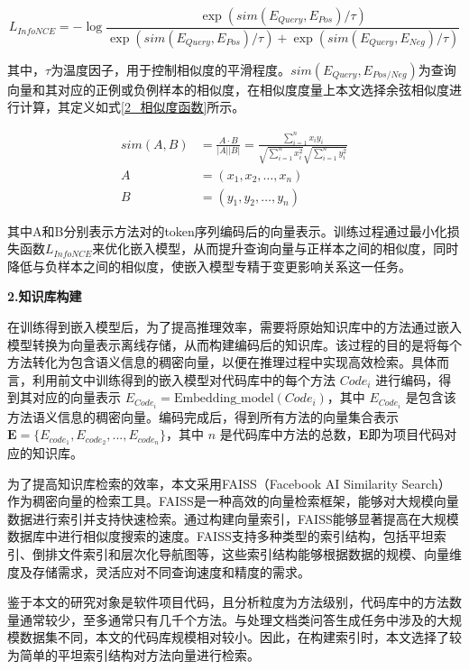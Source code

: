 \begin{equation}
    L_{InfoNCE} = -\log\frac{\exp(sim(E_{Query}, E_{Pos}) / \tau)}
    {\exp(sim(E_{Query}, E_{Pos}) / \tau)+\exp(sim(E_{Query}, E_{Neg}) / \tau)}
\label{2_损失函数}
\end{equation}


其中，$\tau$为温度因子，用于控制相似度的平滑程度。$sim(E_{Query}, E_{Pos/Neg})$为查询向量和其对应的正例或负例样本的相似度，在相似度度量上本文选择余弦相似度进行计算，其定义如式\ref{2_相似度函数}所示。

\begin{align}
\label{2_相似度函数}
sim(A,B)&=\frac{A\cdot B}{\vert A\vert\vert B\vert}=\frac{\sum_{i = 1}^{n}x_iy_i}{\sqrt{\sum_{i = 1}^{n}x_i^2}\sqrt{\sum_{i = 1}^{n}y_i^2}} \\
A &= (x_1, x_2, \dots, x_n) \\
B &= (y_1, y_2, \dots, y_n)
\end{align}

其中A和B分别表示方法对的token序列编码后的向量表示。训练过程通过最小化损失函数$L_{InfoNCE}$来优化嵌入模型，从而提升查询向量与正样本之间的相似度，同时降低与负样本之间的相似度，使嵌入模型专精于变更影响关系这一任务。

\noindent \textbf{2.知识库构建}

在训练得到嵌入模型后，为了提高推理效率，需要将原始知识库中的方法通过嵌入模型转换为向量表示离线存储，从而构建编码后的知识库。该过程的目的是将每个方法转化为包含语义信息的稠密向量，以便在推理过程中实现高效检索。具体而言，利用前文中训练得到的嵌入模型对代码库中的每个方法 $Code_i$ 进行编码，得到其对应的向量表示 $E_{Code_i} = \text{Embedding\_model}(Code_i)$，其中 $E_{Code_i}$ 是包含该方法语义信息的稠密向量。编码完成后，得到所有方法的向量集合表示 $\mathbf{E} = \{ E_{code_1}, E_{code_2}, ..., E_{code_n} \}$，其中 $n$ 是代码库中方法的总数，$\mathbf{E}$即为项目代码对应的知识库。


为了提高知识库检索的效率，本文采用FAISS（Facebook AI Similarity Search）作为稠密向量的检索工具。FAISS是一种高效的向量检索框架，能够对大规模向量数据进行索引并支持快速检索\cite{meta2024faiss}。通过构建向量索引，FAISS能够显著提高在大规模数据库中进行相似度搜索的速度。FAISS支持多种类型的索引结构，包括平坦索引、倒排文件索引和层次化导航图等，这些索引结构能够根据数据的规模、向量维度及存储需求，灵活应对不同查询速度和精度的需求。

鉴于本文的研究对象是软件项目代码，且分析粒度为方法级别，代码库中的方法数量通常较少，至多通常只有几千个方法。与处理文档类问答生成任务中涉及的大规模数据集不同，本文的代码库规模相对较小。因此，在构建索引时，本文选择了较为简单的平坦索引结构对方法向量进行检索。

